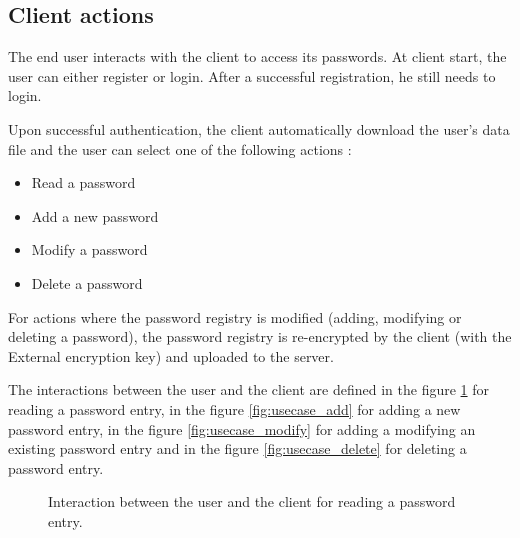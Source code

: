 ﻿\documentclass[../report.tex]{subfiles}
\begin{document}
\subsection{Client actions}
The end user interacts with the client to access its passwords.
At client start, the user can either register or login.
After a successful registration, he still needs to login.

Upon successful authentication, the client automatically download the user's data file and the user can select one of the following actions :
\begin{itemize}
 \item Read a password
 \item Add a new password
 \item Modify a password
 \item Delete a password
\end{itemize}
For actions where the password registry is modified (adding, modifying or deleting a password), the password registry is re-encrypted by the client (with the External encryption key) and uploaded to the server.

The interactions between the user and the client are defined in the figure \ref{fig:usecase_read} for reading a password entry, in the figure \ref{fig:usecase_add} for adding a new password entry, in the figure \ref{fig:usecase_modify} for adding a modifying an existing password entry and in the figure \ref{fig:usecase_delete} for deleting a password entry.



\begin{figure}[h]
 \centering
 \setlength{\fboxsep}{10pt}
 \setlength{\fboxrule}{1pt}
 \caption{Interaction between the user and the client for reading a password entry.}
 \label{fig:usecase_read}
\end{figure}
\end{document}
